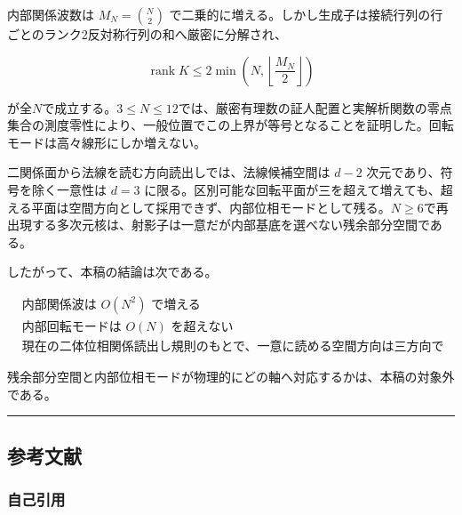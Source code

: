 \documentclass[
  a4paper,
]{ltjsarticle}
\begin{document}
内部関係波数は \(M_N=\binom{N}{2}\)
で二乗的に増える。しかし生成子は接続行列の行ごとのランク2反対称行列の和へ厳密に分解され、

\[
\operatorname{rank}K\le2\min\!\left(N,\left\lfloor\frac{M_N}{2}\right\rfloor\right)
\]

が全\(N\)で成立する。\(3\le N\le12\)では、厳密有理数の証人配置と実解析関数の零点集合の測度零性により、一般位置でこの上界が等号となることを証明した。回転モードは高々線形にしか増えない。

二関係面から法線を読む方向読出しでは、法線候補空間は \(d-2\)
次元であり、符号を除く一意性は \(d=3\)
に限る。区別可能な回転平面が三を超えて増えても、超える平面は空間方向として採用できず、内部位相モードとして残る。\(N\ge6\)で再出現する多次元核は、射影子は一意だが内部基底を選べない残余部分空間である。

したがって、本稿の結論は次である。

\[
\boxed{
\begin{aligned}
&\text{内部関係波は }O(N^2)\text{ で増える}\\
&\text{内部回転モードは }O(N)\text{ を超えない}\\
&\text{現在の二体位相関係読出し規則のもとで、一意に読める空間方向は三方向で飽和する}
\end{aligned}
}
\]

残余部分空間と内部位相モードが物理的にどの軸へ対応するかは、本稿の対象外である。

\begin{center}\rule{0.5\linewidth}{0.5pt}\end{center}

\subsection{参考文献}\label{ux53c2ux8003ux6587ux732e}

\subsubsection{自己引用}\label{ux81eaux5df1ux5f15ux7528}
\end{document}
